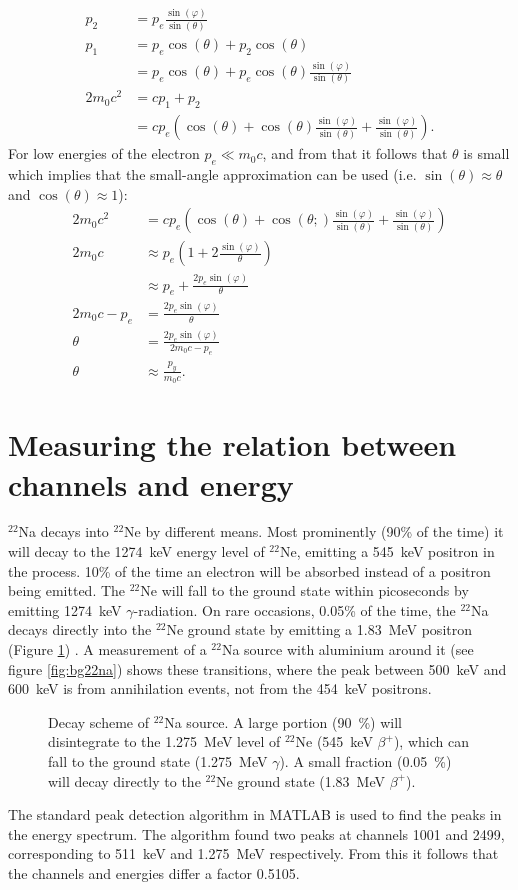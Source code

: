 \begin{align*}
p_2 &= p_e \frac{\sin(\varphi)}{\sin(\theta)}\\
p_1 &= p_e\cos(\theta) + p_2 \cos(\theta)\\
&= p_e \cos(\theta) + p_e \cos(\theta) \frac{\sin(\varphi)}{\sin(\theta)}\\
2m_0c^2 &= cp_1 + p_2\\
&= cp_e\left(\cos(\theta) + \cos(\theta) \frac{\sin(\varphi)}{\sin(\theta)}+\frac{\sin(\varphi)}{\sin(\theta)}\right).
\end{align*} For low energies of the electron $p_e \ll m_0c$, and from that it follows that $\theta$ is small which implies that the small-angle approximation can be used (i.e. $\sin(\theta)\approx \theta$ and $\cos(\theta) \approx 1$): \begin{align*}
2m_0c^2 &= cp_e\left(\cos(\theta) + \cos(\theta;) \frac{\sin(\varphi)}{\sin(\theta)}+\frac{\sin(\varphi)}{\sin(\theta)}\right)\\
2m_0c &\approx p_e\left(1 + 2\frac{\sin(\varphi)}\theta \right)\\
&\approx p_e +\frac{2p_e\sin(\varphi)}{\theta}\\
2m_0c - p_e &= \frac{2p_e\sin(\varphi)}{\theta}\\
\theta &= \frac{2p_e\sin(\varphi)}{2m_0c-p_e}\\
\theta &\approx \frac{p_y}{m_0c}.
\end{align*}

\section{Measuring the relation between channels and energy}\label{ap:na22}
$^{22}$Na decays into $^{22}$Ne by different means. Most prominently (90\% of the time) it will decay to the 1274~keV energy level of $^{22}$Ne, emitting a 545~keV positron in the process. 10\% of the time an electron will be absorbed instead of a positron being emitted. The $^{22}$Ne will fall to the ground state within picoseconds by emitting 1274~keV $\gamma$-radiation. On rare occasions, 0.05\% of the time, the $^{22}$Na decays directly into the $^{22}$Ne ground state by emitting a 1.83~MeV positron (Figure \ref{fig:22na-decay}) \cite{RadiationEnergies}. A measurement of a $^{22}$Na source with aluminium around it (see figure \ref{fig:bg22na}) shows these transitions, where the peak between 500~keV and 600~keV is from annihilation events, not from the 454~keV positrons. 
\begin{figure}[H]
\centering
\resizebox{\columnwidth}{!}{}
\caption{Decay scheme of $^{22}$Na source. A large portion (90~\%) will disintegrate to the 1.275~MeV level of $^{22}$Ne (545~keV $\beta^{+}$), which can fall to the ground state (1.275~MeV $\gamma$). A small fraction (0.05~\%) will decay directly to the $^{22}$Ne ground state (1.83~MeV $\beta^{+}$).}
\label{fig:22na-decay}
\end{figure}
The standard peak detection algorithm in MATLAB is used to find the peaks in the energy spectrum. The algorithm found two peaks at channels 1001 and 2499, corresponding to 511~keV and 1.275~MeV respectively. From this it follows that the channels and energies differ a factor 0.5105.
	
